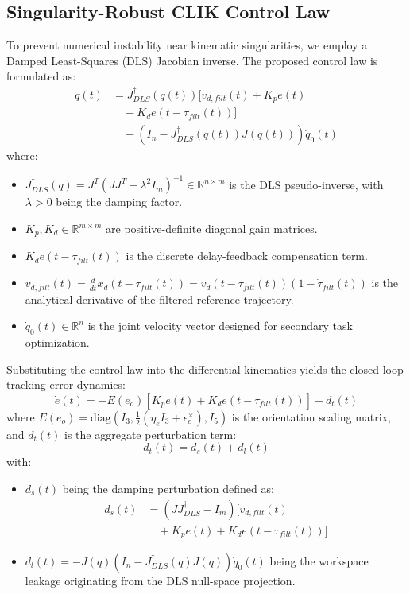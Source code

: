 \documentclass[letterpaper,journal]{IEEEtran}
\begin{document}
\subsection{Singularity-Robust CLIK Control Law}
To prevent numerical instability near kinematic singularities, we employ a Damped Least-Squares (DLS) Jacobian inverse. The proposed control law is formulated as:
\begin{equation}
\begin{split}
\dot{q}(t) &= J^{\dagger}_{DLS}(q(t)) \Big[ v_{d,filt}(t) + K_p e(t) \\
&\quad + K_d e(t - \tau_{filt}(t)) \Big] \\
&\quad + \left( I_n - J^{\dagger}_{DLS}(q(t))J(q(t)) \right) \dot{q}_0(t)
\end{split}
\end{equation}
where:
\begin{itemize}
\item $J^{\dagger}_{DLS}(q) = J^T(JJ^T + \lambda^2 I_m)^{-1} \in \mathbb{R}^{n \times m}$ is the DLS pseudo-inverse, with $\lambda > 0$ being the damping factor.
\item $K_p, K_d \in \mathbb{R}^{m \times m}$ are positive-definite diagonal gain matrices.
\item $K_d e(t - \tau_{filt}(t))$ is the discrete delay-feedback compensation term.
\item $v_{d,filt}(t) = \frac{d}{dt} x_d(t - \tau_{filt}(t)) = v_d(t - \tau_{filt}(t))(1 - \dot{\tau}_{filt}(t))$ is the analytical derivative of the filtered reference trajectory.
\item $\dot{q}_0(t) \in \mathbb{R}^n$ is the joint velocity vector designed for secondary task optimization.
\end{itemize}

Substituting the control law into the differential kinematics yields the closed-loop tracking error dynamics:
\begin{equation}
\dot{e}(t) = -E(e_o) \left[ K_p e(t) + K_d e(t - \tau_{filt}(t)) \right] + d_t(t)
\end{equation}
where $E(e_o) = \text{diag}\left(I_3, \frac{1}{2}(\eta_e I_3 + \epsilon_e^\times), I_{5}\right)$ is the orientation scaling matrix, and $d_t(t)$ is the aggregate perturbation term:
\begin{equation}
d_t(t) = d_s(t) + d_l(t)
\end{equation}
with:
\begin{itemize}
\item $d_s(t)$ being the damping perturbation defined as:
\begin{equation*}
\begin{split}
d_s(t) &= \left( J J^{\dagger}_{DLS} - I_m \right) \Big[ v_{d,filt}(t) \\
&\quad + K_p e(t) + K_d e(t - \tau_{filt}(t)) \Big]
\end{split}
\end{equation*}
\item $d_l(t) = -J(q)\left( I_n - J^{\dagger}_{DLS}(q)J(q) \right)\dot{q}_0(t)$ being the workspace leakage originating from the DLS null-space projection.
\end{itemize}
\end{document}
